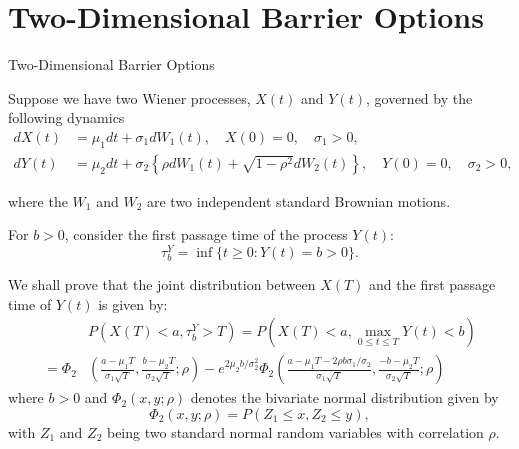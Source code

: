 \documentclass{beamer}
\begin{document}
\section{Two-Dimensional Barrier Options}
\begin{frame}{Two-Dimensional Barrier Options}
    
    {\footnotesize \footnotesize
    \par Suppose we have two Wiener processes, \( X(t) \) and \( Y(t) \), governed by the following dynamics
    \begin{align*}
    dX(t) &= \mu_1 dt + \sigma_1 dW_1(t), \quad X(0) = 0, \quad \sigma_1 > 0, \\
    dY(t) &= \mu_2 dt + \sigma_2 \left\{ \rho dW_1(t) + \sqrt{1 - \rho^2} dW_2(t) \right\}, \quad Y(0) = 0, \quad \sigma_2 > 0,
    \end{align*}
    \par where the \( W_1 \) and \( W_2 \) are two independent standard Brownian motions.\pause
    \par For \( b > 0 \), consider the first passage time of the process \( Y(t) \):
    \[
    \tau_b^Y = \inf\{t \geq 0: Y(t) = b > 0\}.
    \]\pause
    \par We shall prove that the joint distribution between \( X(T) \) and the first passage time of \( Y(t) \) is given by:
    \vspace{-1em}
    \begin{align*}
    &P(X(T) < a, \tau_b^Y > T) = P\left(X(T) < a, \max_{0 \leq t \leq T} Y(t) < b\right) \\
    = \Phi_2 & \left( \frac{a - \mu_1 T}{\sigma_1 \sqrt{T}}, \frac{b - \mu_2 T}{\sigma_2 \sqrt{T}} ; \rho \right) - 
    e^{2 \mu_2 b / \sigma_2^2} \Phi_2 \left( \frac{a - \mu_1 T - 2 \rho b \sigma_1 / \sigma_2}{\sigma_1 \sqrt{T}}, \frac{-b - \mu_2 T}{\sigma_2 \sqrt{T}} ; \rho \right)
    \end{align*}
    where $b > 0$ and \( \Phi_2(x, y; \rho) \) denotes the bivariate normal distribution given by
    \[
    \Phi_2(x, y; \rho) = P(Z_1 \leq x, Z_2 \leq y),
    \]
    with \( Z_1 \) and \( Z_2 \) being two standard normal random variables with correlation \( \rho \).
    \vspace{1em}

    }

\end{frame}
\end{document}
